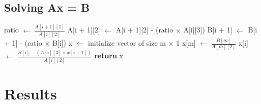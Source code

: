 \documentclass[12pt]{article}
\begin{document}
    \subsection{Solving Ax = B}
    \begin{center}
        \begin{algorithmic}[1]
                \Statex {}
                \Statex {}
                \Statex {}
                    \State ratio $\gets \;\frac{A[i + 1][1]}{A[i][2]}$
                    \State A[i + 1][2] $\gets$ A[i + 1][2] - (ratio $\times$ A[i][3])
                    \State B[i + 1] $\gets$ B[i + 1] - (ratio $\times$ B[i]) 
                \EndFor
                \Statex {}
                \State x $\gets$ initialize vector of size m $\times$ 1
                \State x[m] $\gets \;\frac{B[m]}{A[m][2]}$
                    \State x[i] $\gets \;\frac{B[i] - (A[i][3]\times x[i + 1])}{A[i][2]}$
                \EndFor
                \State \textbf{return} x
            \EndProcedure
        \end{algorithmic}
    \end{center}
    \pagebreak
    \section{Results}
\end{document}

